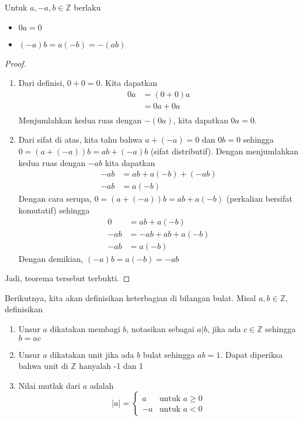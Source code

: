 	\begin{theorem}
		Untuk $a,-a,b \in \mathbb{Z}$ berlaku
		\begin{itemize}
			\item $0a =0$
			\item $(-a)b = a(-b) = -(ab)$
		\end{itemize}
	\end{theorem}
	\begin{proof}
		\begin{enumerate}
			\item Dari definisi, $0 + 0 = 0$. Kita dapatkan
			\begin{equation*}
				\begin{split}
				0a & = (0+0)a\\
				& = 0a + 0a\\
				\end{split}
			\end{equation*}
			Menjumlahkan kedua ruas dengan $-(0a)$, kita dapatkan $0a = 0$.
		\item Dari sifat di atas, kita tahu bahwa $a + (-a) = 0$ dan $0b = 0$ sehingga $0 = (a + (-a))b = ab + (-a)b$ (sifat distributif). Dengan menjumlahkan kedua ruas dengan $-ab$ kita dapatkan
		\begin{equation*}
		\begin{split}
			-ab & = ab + a(-b) + (-ab)\\
			-ab & = a(-b) 
		\end{split}
		\end{equation*}
		Dengan cara serupa, $0 = (a + (-a))b = ab + a(-b)$ (perkalian bersifat komutatif) sehingga
		\begin{equation*}
			\begin{split}
				0 & = ab + a(-b)\\
				-ab & = -ab + ab + a(-b)\\
				-ab & = a(-b)
			\end{split}
		\end{equation*}
		Dengan demikian, $(-a)b = a(-b) = -ab$
		\end{enumerate}
	
	Jadi, teorema tersebut terbukti.
	\end{proof}
	
	Berikutnya, kita akan definisikan keterbagian di bilangan bulat. Misal $a,b \in \mathbb{Z}$, definisikan
	\begin{enumerate}
		\item Unsur $a$ dikatakan membagi $b$, notasikan sebagai $a | b$, jika ada $c \in \mathbb{Z}$ sehingga $b = ac$
		\item Unsur $a$ dikatakan unit jika ada $b$ bulat sehingga $ab = 1$. Dapat diperiksa bahwa unit di $\mathbb{Z}$ hanyalah -1 dan 1
		\item Nilai mutlak dari $a$ adalah $$ |a| =  
		\begin{cases}
			a &\mbox{untuk $a \ge 0$}\\
			-a &\mbox{untuk $a < 0$}
		\end{cases}	$$
	\end{enumerate}
	
